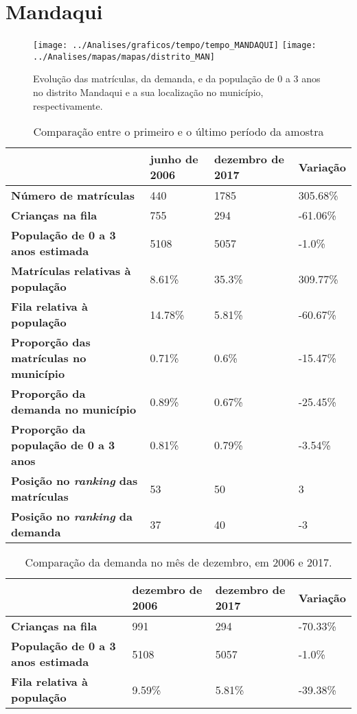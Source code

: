 \section{Mandaqui}
\begin{figure}[H]
\centering
\texttt{[image: ../Analises/graficos/tempo/tempo\_MANDAQUI]}
\texttt{[image: ../Analises/mapas/mapas/distrito\_MAN]}
\caption{Evolução das matrículas, da demanda, e da população de 0 a 3 anos no distrito Mandaqui e a sua localização no município, respectivamente.}
\end{figure}
\begin{table}[H]
\begin{tabular}{l|l|l|l}
\textbf{}                                      & \textbf{junho de 2006}       & \textbf{dezembro de 2017}    & \textbf{Variação} \\ \hline
\textbf{Número de matrículas}                  & 440 & 1785 & 305.68\% \\ \hline
\textbf{Crianças na fila}                      & 755 & 294 & -61.06\% \\ \hline
\textbf{População de 0 a 3 anos estimada}      & 5108 & 5057 & -1.0\% \\ \hline
\textbf{Matrículas relativas à população}      & 8.61\% & 35.3\% & 309.77\% \\ \hline
\textbf{Fila relativa à população}             & 14.78\% & 5.81\% & -60.67\% \\ \hline
\textbf{Proporção das matrículas no município} & 0.71\% & 0.6\% & -15.47\% \\ \hline
\textbf{Proporção da demanda no município}     & 0.89\% & 0.67\% & -25.45\% \\ \hline
\textbf{Proporção da população de 0 a 3 anos}  & 0.81\% & 0.79\% & -3.54\% \\ \hline
\textbf{Posição no \textit{ranking} das matrículas}     & 53 & 50 & 3 \\ \hline
\textbf{Posição no \textit{ranking} da demanda}         & 37 & 40 & -3 \\ 
\end{tabular}
\caption{Comparação entre o primeiro e o último período da amostra}
\end{table}
\begin{table}[H]
\begin{tabular}{l|l|l|l}
\textbf{}                                 & \textbf{dezembro de 2006} & \textbf{dezembro de 2017} & \textbf{Variação} \\ \hline
\textbf{Crianças na fila}                      & 991 & 294 & -70.33\% \\ \hline
\textbf{População de 0 a 3 anos estimada}      & 5108 & 5057 & -1.0\% \\ \hline
\textbf{Fila relativa à população}             & 9.59\% & 5.81\% & -39.38\% \\
\end{tabular}
\caption{Comparação da demanda no mês de dezembro, em 2006 e 2017.}
\end{table}
